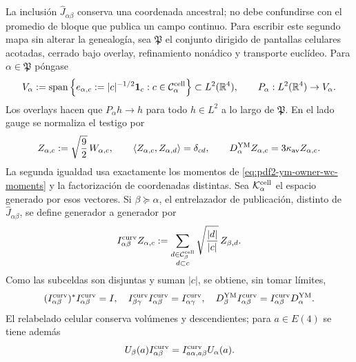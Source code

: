 La inclusión $\widehat J_{\alpha\beta}$ conserva una coordenada ancestral; no debe
confundirse con el promedio de bloque que publica un campo continuo. Para escribir
este segundo mapa sin alterar la genealogía, sea $\mathfrak P$ el conjunto dirigido
de pantallas celulares acotadas, cerrado bajo overlay, refinamiento nonádico y
transporte euclídeo. Para $\alpha\in\mathfrak P$ póngase
\begin{equation}\label{eq:pdf2-ym-owner-cell-step-space}
 V_\alpha:=\operatorname{span}\left\{
 e_{\alpha,c}:=|c|^{-1/2}\mathbf1_c:
 c\in\mathcal C_\alpha^{\rm cell}\right\}
 \subset L^2(\mathbb R^4),
 \qquad P_\alpha:L^2(\mathbb R^4)\to V_\alpha.
\end{equation}
Los overlays hacen que $P_\alpha h\to h$ para todo $h\in L^2$ a lo largo de
$\mathfrak P$. En el lado gauge se normaliza el testigo por
\begin{equation}\label{eq:pdf2-ym-owner-normalized-cell-witness}
 Z_{\alpha,c}:=\sqrt{\frac92}\,W_{\alpha,c},
 \qquad
 \langle Z_{\alpha,c},Z_{\alpha,d}\rangle=\delta_{cd},
 \qquad
 D_\alpha^{\rm YM}Z_{\alpha,c}=3\kappa_{\rm av}Z_{\alpha,c}.
\end{equation}
La segunda igualdad usa exactamente los momentos de
\eqref{eq:pdf2-ym-owner-wc-moments} y la factorización de coordenadas distintas.
Sea $\mathcal K_\alpha^{\rm cell}$ el espacio generado por esos vectores. Si
$\beta\succeq\alpha$, el entrelazador de publicación, distinto de
$\widehat J_{\alpha\beta}$, se define generador a generador por
\begin{equation}\label{eq:pdf2-ym-owner-block-intertwiner}
 I_{\alpha\beta}^{\rm curv}Z_{\alpha,c}
 :=\sum_{\substack{d\in\mathcal C_\beta^{\rm cell}\\d\subset c}}
       \sqrt{\frac{|d|}{|c|}}\,Z_{\beta,d}.
\end{equation}
Como las subceldas son disjuntas y suman $|c|$, se obtiene, sin tomar límites,
\begin{equation}\label{eq:pdf2-ym-owner-block-intertwiner-identities}
 (I_{\alpha\beta}^{\rm curv})^*I_{\alpha\beta}^{\rm curv}=I,
 \quad
 I_{\beta\gamma}^{\rm curv}I_{\alpha\beta}^{\rm curv}
 =I_{\alpha\gamma}^{\rm curv},
 \quad
 D_\beta^{\rm YM}I_{\alpha\beta}^{\rm curv}
 =I_{\alpha\beta}^{\rm curv}D_\alpha^{\rm YM}.
\end{equation}
El relabelado celular conserva volúmenes y descendientes; para $a\in E(4)$ se tiene además
\begin{equation}\label{eq:pdf2-ym-owner-block-e4-naturality}
 U_\beta(a)I_{\alpha\beta}^{\rm curv}
 =I_{a\alpha,a\beta}^{\rm curv}U_\alpha(a).
\end{equation}

